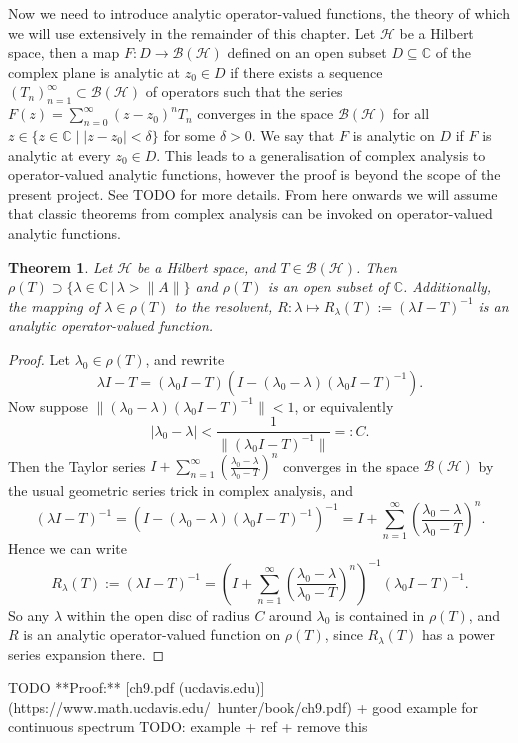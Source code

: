\documentclass[12pt,oneside]{report}
\newtheorem{thm}{Theorem}[chapter]
\begin{document}
Now we need to introduce analytic operator-valued functions, the theory of which we will use extensively in the remainder of this chapter. Let $\mathscr{H}$ be a Hilbert space, then a map $F: D \to \mathscr{B}(\mathscr{H})$ defined on an open subset $D \subseteq \mathbb{C}$ of the complex plane is analytic at $z_{0} \in D$ if there exists a sequence $(T_{n})_{n=1}^{\infty} \subset \mathscr{B}(\mathscr{H})$ of operators such that the series $F(z) = \sum_{n=0}^{\infty} (z - z_{0})^{n}T_{n}$ converges in the space $\mathscr{B}(\mathscr{H})$ for all $z \in \{ z \in \mathbb{C} \; | \; |z - z_{0}| < \delta \}$ for some $\delta > 0$. We say that $F$ is analytic on $D$ if $F$ is analytic at every $z_{0} \in D$. This leads to a generalisation of complex analysis to operator-valued analytic functions, however the proof is beyond the scope of the present project. See TODO for more details. From here onwards we will assume that classic theorems from complex analysis can be invoked on operator-valued analytic functions.

\begin{thm}\label{resolvent-analytic}
    Let $\mathscr{H}$ be a Hilbert space, and $T \in \mathscr{B}(\mathscr{H})$. Then $\rho(T) \supset \{ \lambda \in \mathbb{C} \, | \, \lambda > \|A\| \}$ and $\rho(T)$ is an open subset of $\mathbb{C}$. Additionally, the mapping of $\lambda \in \rho(T)$ to the resolvent, $R: \lambda \mapsto R_\lambda(T) := (\lambda I - T)^{-1}$ is an analytic operator-valued function.
\end{thm}
\begin{proof}
    Let $\lambda_{0} \in \rho(T)$, and rewrite $$\lambda I - T = (\lambda_{0}I - T)(I - (\lambda_{0} - \lambda)(\lambda_{0}I - T)^{-1}).$$ Now suppose $\|(\lambda_{0} - \lambda)(\lambda_{0}I - T)^{-1}\| < 1$, or equivalently $$|\lambda_{0}-\lambda| < \frac{1}{\|(\lambda_{0}I - T)^{-1}\|} =: C.$$ Then the Taylor series $I + \sum_{n=1}^{\infty}\left(\frac{\lambda_{0}-\lambda}{\lambda_{0}-T}\right)^{n}$ converges in the space $\mathscr{B}(\mathscr{H})$ by the usual geometric series trick in complex analysis, and $$(\lambda I - T)^{-1} = (I - (\lambda_{0} - \lambda)(\lambda_{0} I - T)^{-1})^{-1} = I + \sum_{n=1}^{\infty}\left(\frac{\lambda_{0}-\lambda}{\lambda_{0}-T}\right)^{n}.$$ Hence we can write $$R_{\lambda}(T) := (\lambda I - T)^{-1} = \left(I + \sum_{n=1}^{\infty}\left(\frac{\lambda_{0}-\lambda}{\lambda_{0}-T}\right)^{n}\right)^{-1}(\lambda_{0}I - T)^{-1}.$$ So any $\lambda$ within the open disc of radius $C$ around $\lambda_{0}$ is contained in $\rho(T)$, and $R$ is an analytic operator-valued function on $\rho(T)$, since $R_{\lambda}(T)$ has a power series expansion there.
\end{proof}
TODO **Proof:** [ch9.pdf (ucdavis.edu)](https://www.math.ucdavis.edu/~hunter/book/ch9.pdf) + good example for continuous spectrum TODO: example + ref + remove this
\end{document}
